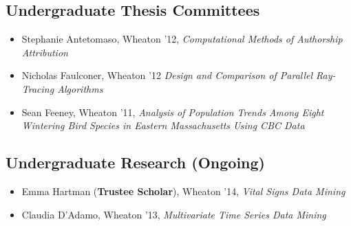 \documentclass[12pt]{article}
\begin{document}
\subsection*{Undergraduate Thesis Committees}
\begin{itemize}
  \setlength{\itemsep}{1pt}
  \setlength{\parskip}{0pt}
  \setlength{\parsep}{0pt}
  \item Stephanie Antetomaso, Wheaton '12, {\em Computational Methods of Authorship Attribution}
  \item Nicholas Faulconer, Wheaton '12 {\em Design and Comparison of Parallel Ray-Tracing Algorithms}
  \item Sean Feeney, Wheaton '11, {\em Analysis of Population Trends Among Eight Wintering Bird Species in Eastern Massachusetts Using CBC Data}
\end{itemize}

\subsection*{Undergraduate Research (Ongoing)}

\begin{itemize}
  \setlength{\itemsep}{1pt}
  \setlength{\parskip}{0pt}
  \setlength{\parsep}{0pt}
  \item Emma Hartman ({\bf Trustee Scholar}), Wheaton '14, {\em Vital Signs Data Mining}
  \item Claudia D'Adamo, Wheaton '13, {\em Multivariate Time Series Data Mining}
\end{itemize}
\end{document}
